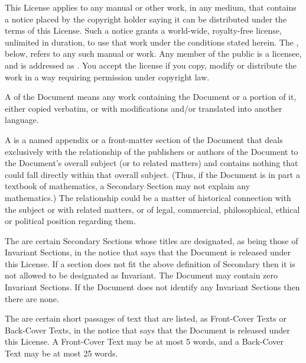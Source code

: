 \stopalignment

This License applies to any manual or other work, in any medium, that
contains a notice placed by the copyright holder saying it can be
distributed under the terms of this License.  Such a notice grants a
world-wide, royalty-free license, unlimited in duration, to use that
work under the conditions stated herein.  The , below,
refers to any such manual or work.  Any member of the public is a
licensee, and is addressed as .  You accept the license if you
copy, modify or distribute the work in a way requiring permission
under copyright law.

A  of the Document means any work containing the
Document or a portion of it, either copied verbatim, or with
modifications and/or translated into another language.

A  is a named appendix or a front-matter section of
the Document that deals exclusively with the relationship of the
publishers or authors of the Document to the Document's overall subject
(or to related matters) and contains nothing that could fall directly
within that overall subject.  (Thus, if the Document is in part a
textbook of mathematics, a Secondary Section may not explain any
mathematics.)  The relationship could be a matter of historical
connection with the subject or with related matters, or of legal,
commercial, philosophical, ethical or political position regarding
them.

The  are certain Secondary Sections whose titles
are designated, as being those of Invariant Sections, in the notice
that says that the Document is released under this License.  If a
section does not fit the above definition of Secondary then it is not
allowed to be designated as Invariant.  The Document may contain zero
Invariant Sections.  If the Document does not identify any Invariant
Sections then there are none.

The  are certain short passages of text that are listed,
as Front-Cover Texts or Back-Cover Texts, in the notice that says that
the Document is released under this License.  A Front-Cover Text may
be at most 5 words, and a Back-Cover Text may be at most 25 words.

